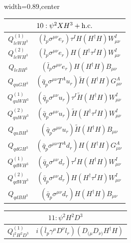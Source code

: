 \begin{table}[H]
\begin{center}
\begin{adjustbox}{width=0.89\textwidth,center}
\small
\begin{minipage}[t]{5.4cm}
\renewcommand{\arraystretch}{1.5}
\begin{tabular}[t]{c|c}
\multicolumn{2}{c}{\boldmath$10:\psi^2XH^3 + \mathrm{h.c.}$} \\
\hline
$Q_{leWH^3}^{(1)}$  & $(\bar l_p \sigma^{\mu\nu} e_r) \tau^I H (H^\dag H) W_{\mu\nu}^I$ \\
%
$Q_{leWH^3}^{(2)}$  & $(\bar l_p \sigma^{\mu\nu} e_r) H (H^\dag \tau^I H) W_{\mu\nu}^I$ \\
%
$Q_{leBH^3}$  & $(\bar l_p \sigma^{\mu\nu} e_r) H (H^\dag H) B_{\mu\nu}$ \\
%
$Q_{quGH^3}$  & $(\bar q_p \sigma^{\mu\nu} T^A u_r) \widetilde H (H^\dag H) G_{\mu\nu}^A$ \\
%
$Q_{quWH^3}^{(1)}$  & $(\bar q_p \sigma^{\mu\nu} u_r) \tau^I \widetilde H (H^\dag H) W_{\mu\nu}^I$ \\
%
$Q_{quWH^3}^{(2)}$  & $(\bar q_p \sigma^{\mu\nu} u_r) \widetilde H (H^\dag \tau^I H) W_{\mu\nu}^I$ \\
%
$Q_{quBH^3}$  & $(\bar q_p \sigma^{\mu\nu} u_r) \widetilde H (H^\dag H) B_{\mu\nu}$ \\
%
$Q_{qdGH^3}$  & $(\bar q_p \sigma^{\mu\nu} T^A d_r) H (H^\dag H) G_{\mu\nu}^A$ \\
%
$Q_{qdWH^3}^{(1)}$  & $(\bar q_p \sigma^{\mu\nu} d_r) \tau^I H (H^\dag H) W_{\mu\nu}^I$ \\
%
$Q_{qdWH^3}^{(2)}$  & $(\bar q_p \sigma^{\mu\nu} d_r) H (H^\dag \tau^I H) W_{\mu\nu}^I$ \\
%
$Q_{qdBH^3}$  & $(\bar q_p \sigma^{\mu\nu} d_r) H (H^\dag H) B_{\mu\nu}$ 
\end{tabular}
\end{minipage}
\hspace{1cm}
\begin{minipage}[t]{6.9cm}
\renewcommand{\arraystretch}{1.5}
\begin{tabular}[t]{c|c}
\multicolumn{2}{c}{\boldmath$11:\psi^2H^2D^3$} \\
\hline
$Q_{l^2H^2D^3}^{(1)}$  &  $i (\bar{l}_p \gamma^{\mu} D^{\nu} l_r) (D_{(\mu}D_{\nu)}H^{\dag} H)$ \\

\end{tabular}
\end{minipage}
\end{adjustbox}
\end{center}
\end{table}
